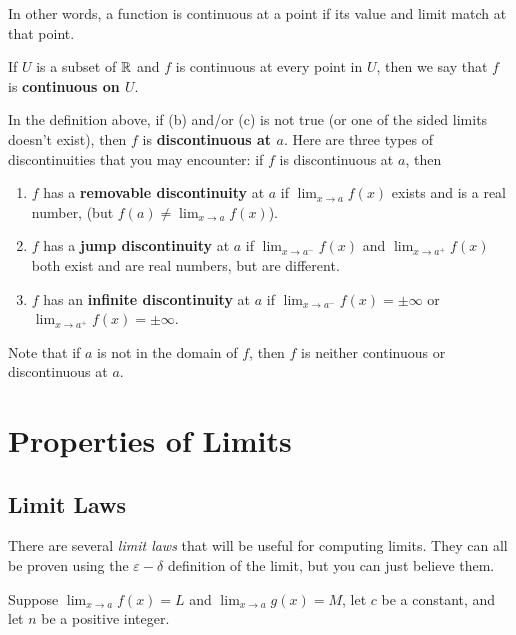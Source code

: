 In other words, a function is continuous at a point if its value and limit match at that point.

If $U$ is a subset of $\mathbb{R}$ and $f$ is continuous at every point in $U$, then we say that $f$ is \textbf{continuous on $U$}.

In the definition above, if (b) and/or (c) is not true (or one of the sided limits doesn't exist), then $f$ is \textbf{discontinuous at $a$}. Here are three types of discontinuities that you may encounter: if $f$ is discontinuous at $a$, then
\begin{enumerate}
\item $f$ has a \textbf{removable discontinuity} at $a$ if $\displaystyle\lim _{x \to a} f(x)$ exists and is a real number, (but $\displaystyle f(a)\neq\lim _{x \to a} f(x)$).
\item $f$ has a \textbf{jump discontinuity} at $a$ if $\displaystyle\lim _{x \to a^{-}} f(x)$ and $\displaystyle\lim _{x \to a^{+}} f(x)$ both exist and are real numbers, but are different.
\item $f$ has an \textbf{infinite discontinuity} at $a$ if $\displaystyle\lim _{x \to a^{-}} f(x)=\pm \infty$ or $\displaystyle\lim _{x \to a^{+}} f(x)=\pm \infty$.
\end{enumerate}

Note that if $a$ is not in the domain of $f$, then $f$ is neither continuous or discontinuous at $a$.


\section{Properties of Limits}


\subsection{Limit Laws}

There are several \textit{limit laws} that will be useful for computing limits. They can all be proven using the $\varepsilon-\delta$ definition of the limit, but you can just believe them.

Suppose $\displaystyle\lim _{x \to a} f(x)=L$ and $\displaystyle\lim _{x \to a} g(x)=M$, let $c$ be a constant, and let $n$ be a positive integer.

